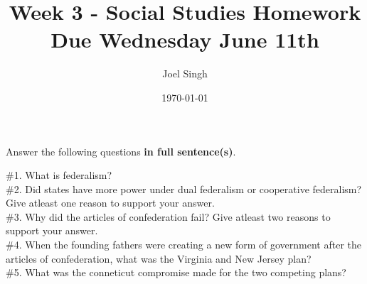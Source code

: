 \documentclass{article}
\title{Week 3 - Social Studies Homework \\ Due Wednesday June 11th}
\author{Joel Singh}
\date{\today}
\begin{document}
\maketitle

Answer the following questions \textbf{in full sentence(s)}. 

\#1. What is federalism? \vspace{2in} \\

\#2. Did states have more power under dual federalism or cooperative federalism? Give atleast one reason to support your answer.\vspace{2in} \\

\#3. Why did the articles of confederation fail? Give atleast two reasons to support your answer. \vspace{2in} \\

\#4. When the founding fathers were creating a new form of government after the articles of confederation, what was the Virginia and New Jersey plan? \vspace{2in} \\

\#5. What was the conneticut compromise made for the two competing plans? \vspace{2in} \\
\end{document}
